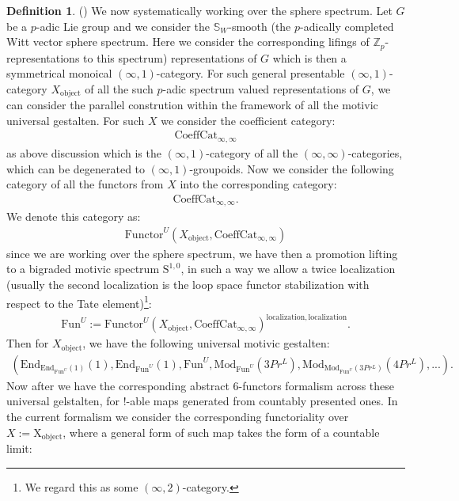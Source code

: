 \documentclass[12pt]{article}
\theoremstyle{definition}
\newtheorem{definition}{Definition}
\begin{document}
\begin{definition}()
We now systematically working over the sphere spectrum. Let $G$ be a $p$-adic Lie group and we consider the $\mathbb{S}_W$-smooth (the $p$-adically completed Witt vector sphere spectrum. Here we consider the corresponding lifings of $\mathbb{Z}_p$-representations to this spectrum) representations of $G$ which is then a symmetrical monoical $(\infty,1)$-category. For such general presentable $(\infty,1)$-category $X_\mathrm{object}$ of all the such $p$-adic spectrum valued representations of $G$, we can consider the parallel constrution within the framework of all the motivic universal gestalten. For such $X$ we consider the coefficient category:
\begin{align}
\mathrm{CoeffCat}_{\infty,\infty}
\end{align}
as above discussion which is the $(\infty,1)$-category of all the $(\infty,\infty)$-categories, which can be degenerated to $(\infty,1)$-groupoids. Now we consider the following category of all the functors from $X$ into the corresponding category:
\begin{align}
\mathrm{CoeffCat}_{\infty,\infty}.
\end{align}
We denote this category as:
\begin{align}
\mathrm{Functor}^U(X_\mathrm{object},\mathrm{CoeffCat}_{\infty,\infty})
\end{align}
since we are working over the sphere spectrum, we have then a promotion lifting to a bigraded motivic spectrum $\mathrm{S}^{1,0}$, in such a way we allow a twice localization (usually the second localization is the loop space functor stabilization with respect to the Tate element)\footnote{We regard this as some $(\infty,2)$-category.}:
\begin{align}
\mathrm{Fun}^U:=\mathrm{Functor}^U(X_\mathrm{object},\mathrm{CoeffCat}_{\infty,\infty})^{\mathrm{localization}, \mathrm{localization}}.
\end{align}
Then for $X_\mathrm{object}$, we have the following universal motivic gestalten:
\begin{align}
(\mathrm{End}_{\mathrm{End}_{\mathrm{Fun}^U}(1)}(1),\mathrm{End}_{\mathrm{Fun}^U}(1),\mathrm{Fun}^U,\mathrm{Mod}_{\mathrm{Fun}^U}(3Pr^L),\mathrm{Mod}_{\mathrm{Mod}_{\mathrm{Fun}^U}(3Pr^L)}(4Pr^L),...).
\end{align}
Now after \cite{5S5} we have the corresponding abstract 6-functors formalism across these universal gelstalten, for $!$-able maps generated from countably presented ones. In the current formalism we consider the corresponding functoriality over $X:=\mathrm{X}_\mathrm{object}$, where a general form of such map takes the form of a countable limit:

\end{definition}
\end{document}
